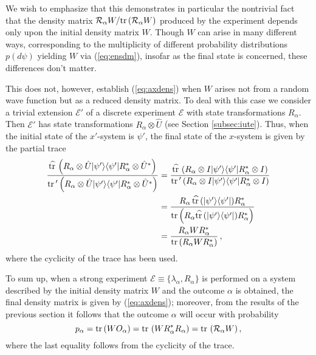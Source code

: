 \documentclass[12pt]{article}
\newcommand{\eq}[1]{(\ref{#1})}
\renewcommand{\dagger}{\ast}
\newcommand{\tr}{\mbox{${\rm tr}\,$}}
\renewcommand{\a}{\alpha}
\newcommand{\la}{\lambda_{\a}}
\newcommand{\ot}{\otimes}
\newcommand{\Aa}{R_{\a}}
\newcommand{\Aad}{R^{\dagger}_{\a}}
\newcommand{\E}{\mbox{$\mathscr{E}$}}
\begin{document}
We wish to emphasize that this demonstrates in particular the
nontrivial fact that the density matrix $\mathcal{R}_\a
W/\tr(\mathcal{R}_\a W)$ produced by the experiment depends only upon
the initial density matrix $W$. Though $W$ can arise in many different
ways, corresponding to the multiplicity of different probability
distributions $p(d\psi)$ yielding $W$ via \eq{eq:ensdm}, insofar as
the final state is concerned, these differences don't matter.

This does not, however, establish \eq{eq:axdens} when $W$ arises not
{}from a random wave function but as a reduced density matrix. To deal
with this case we consider a trivial extension $\E'$ of a discrete
experiment \E{} with state transformations $\Aa$. Then $\E'$ has state
transformations $\Aa\ot \hat{U}$ (see Section \ref{subsec:iute}).
Thus, when the initial state of the $x'$-system is $\psi'$, the final
state of the $x$-system is given by the partial trace
\begin{equation*}
\begin{split}
\frac{\widehat{\tr} \left(\Aa\otimes \hat{U}| \psi '\rangle \langle
     \psi' |\Aad\otimes \hat{U}^{*}\right)}{\tr'\left(\Aa\otimes
     \hat{U}| \psi '\rangle \langle \psi' |\Aad\otimes
     \hat{U}^{*}\right)}
 &= \frac{\widehat{\tr} \left(\Aa\otimes I| \psi
     '\rangle \langle \psi' |\Aad\otimes I\right)}{\tr'
   \left(\Aa\otimes I| \psi '\rangle \langle \psi' |\Aad\otimes
     I\right)} \\
 &=\frac{\Aa \, \widehat{\tr} (| \psi' \rangle \langle
   \psi '|) \Aad}{\tr\!\left(\Aa \widehat{\tr} (| \psi' \rangle \langle
     \psi '|) \Aad\right)}\\
&= \frac{\Aa W \Aad}{\tr\!\left(\Aa W \Aad\right)} \, ,
\end{split}
\end{equation*}
where the cyclicity of the trace has been used.


To sum up, when a strong experiment $\mathcal{E}\equiv\{\la, \Aa\}$ is
performed on a system described by the initial density matrix $W$ and
the outcome $\a$ is obtained, the final density matrix is given by
(\ref{eq:axdens}); moreover, {}from the results of the previous
section it follows that the outcome $\a$ will occur with probability
\begin{equation}
p_{\a}= \tr( W O_{\a})= \tr\left( W \Aad\Aa\right) = \tr\left(
\mathcal{R}_\a W \right),
\label{eq:pexdm}
\end{equation}
where the last equality follows {}from the cyclicity of the trace.
\end{document}
